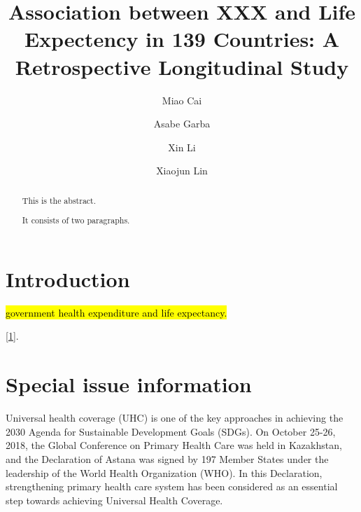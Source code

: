 \documentclass[]{elsarticle} %
\begin{document}
\begin{frontmatter}

  \title{Association between XXX and Life Expectency in 139 Countries: A Retrospective Longitudinal Study}
    \author[SLU]{Miao Cai}
  
    \author[SLU]{Asabe Garba}
  
    \author[WHU]{Xin Li}
  
    \author[SCU]{Xiaojun Lin}
      \address[SLU]{Saint Louis University, Saint Louis, MO, 63108}
    \address[SCU]{Sichuan University, Chengdu, Sichuan, China}
    \address[WHU]{Wuhan University, Wuhan, Hubei, China}
  
  \begin{abstract}
  This is the abstract.
  
  It consists of two paragraphs.
  \end{abstract}
  
 \end{frontmatter}

\newcommand{\blandscape}{\begin{landscape}}
\newcommand{\elandscape}{\end{landscape}}
\doublespacing

\hypertarget{introduction}{%
\section{Introduction}\label{introduction}}

\hl{government health expenditure and life expectancy.}

{[}\protect\hyperlink{ref-wagstaff2018progress}{1}{]}.

\hypertarget{special-issue-information}{%
\section{Special issue information}\label{special-issue-information}}

Universal health coverage (UHC) is one of the key approaches in achieving the 2030 Agenda for Sustainable Development Goals (SDGs). On October 25-26, 2018, the Global Conference on Primary Health Care was held in Kazakhstan, and the Declaration of Astana was signed by 197 Member States under the leadership of the World Health Organization (WHO). In this Declaration, strengthening primary health care system has been considered as an essential step towards achieving Universal Health Coverage.
\end{document}

